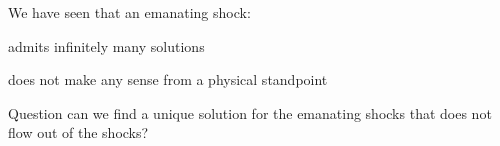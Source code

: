 \begin{sectionbox}\nospacing
    We have seen that an emanating shock:
    \begin{circlelistnosep}
        \item admits infinitely many solutions
        \item does not make any sense from a physical standpoint
    \end{circlelistnosep}
    \begin{minipage}{0.5\textwidth}
    Question can we find a unique solution for the emanating shocks that does not flow out of the shocks?
    \end{minipage}\hfill
    \begin{minipage}[c]{0.45\textwidth}
      \begin{figure}[H]
          \centering{
            \def\svgwidth{120pt}
            \resizebox{\linewidth}{!}{}
          }
      \end{figure}
    \end{minipage}
\end{sectionbox}
